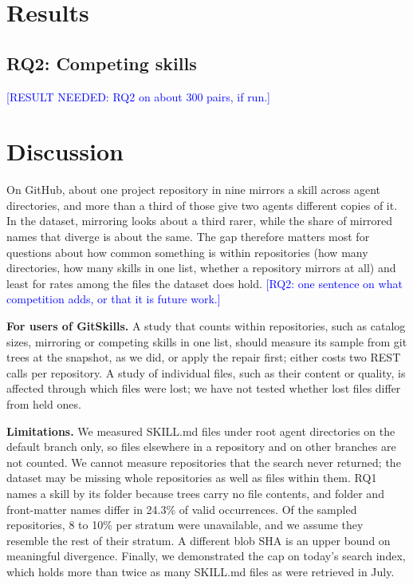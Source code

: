 \documentclass[10pt,conference]{IEEEtran}
\newcommand{\todo}[1]{\textcolor{blue}{[#1]}}
\begin{document}
\section{Results}
\label{sec:results}

\subsection{RQ2: Competing skills}
\todo{RESULT NEEDED: RQ2 on about 300 pairs, if run.}

\section{Discussion}
\label{sec:discussion}
On GitHub, about one project repository in nine mirrors a skill across agent directories, and more than a
third of those give two agents different copies of it. In the dataset, mirroring looks about a third rarer,
while the share of mirrored names that diverge is about the same. The gap therefore matters most for questions about
how common something is within repositories (how many directories, how many skills in one list, whether a repository
mirrors at all) and least for rates among the files the dataset does hold. \todo{RQ2: one sentence on what competition adds, or that it is future work.}

\textbf{For users of GitSkills.} A study that counts within repositories, such as catalog sizes, mirroring or
competing skills in one list, should measure its sample from git trees at the snapshot, as we did, or apply the
repair first; either costs two REST calls per repository. A study of individual files, such as their content or
quality, is affected through which files were lost; we have not tested whether lost files differ from held ones.

\textbf{Limitations.} We measured SKILL.md files under root agent directories on the default branch only, so files
elsewhere in a repository and on other branches are not counted. We cannot measure repositories that the search
never returned; the dataset may be missing whole repositories as well as files within them. RQ1 names a skill by its
folder because trees carry no file contents, and folder and front-matter names differ in 24.3\% of valid occurrences.
Of the sampled repositories, 8 to 10\% per stratum were unavailable, and we assume they resemble the rest of their
stratum. A different blob SHA is an upper bound on meaningful divergence. Finally, we demonstrated the cap on
today's search index, which holds more than twice as many SKILL.md files as were retrieved in July.
\end{document}
